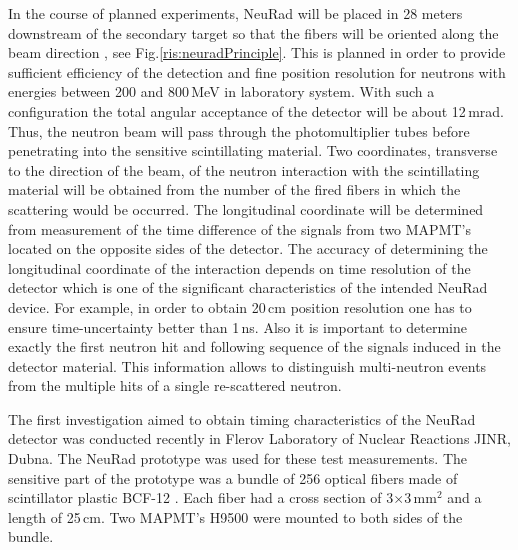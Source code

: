\documentclass{webofc}
\begin{document}
In the course of planned experiments, NeuRad will be placed in 28 meters downstream of the secondary target so that the fibers will be oriented along the beam direction \cite{report}, see Fig.\ref{ris:neuradPrinciple}.
This is planned in order to provide sufficient efficiency of the detection and fine position resolution for neutrons with energies between 200 and 800\,MeV in laboratory system.
With such a configuration the total angular acceptance of the detector will be about 12\,mrad.
Thus, the neutron beam will pass through the photomultiplier tubes before penetrating into the sensitive scintillating material.
Two coordinates, transverse to the direction of the beam, of the neutron interaction with the scintillating material will be obtained from the number of the fired fibers in which the scattering would be occurred.
The longitudinal coordinate will be determined from measurement of the time difference of the signals from two MAPMT's located on the opposite sides of the detector.
The accuracy of determining the longitudinal coordinate of the interaction depends on time resolution of the detector which is one of the significant characteristics of the intended NeuRad device.
For example, in order to obtain 20\,cm position resolution one has to ensure time-uncertainty better than 1\,ns.
Also it is important to determine exactly the first neutron hit and following sequence of the signals induced in the detector material. This information allows to distinguish multi-neutron events from the multiple hits of a single re-scattered neutron.


The first investigation aimed to obtain timing characteristics of the NeuRad detector was conducted recently in Flerov Laboratory of Nuclear Reactions JINR, Dubna. The NeuRad prototype was used for these test measurements. The sensitive part of the prototype was a bundle of 256 optical fibers made of scintillator plastic BCF-12 \cite{crystals}. 
Each fiber had a cross section of 3$\times$3\,mm$^2$ and a length of 25\,cm. Two MAPMT's H9500 \cite{hm} were mounted to both sides of the bundle.
\end{document}
